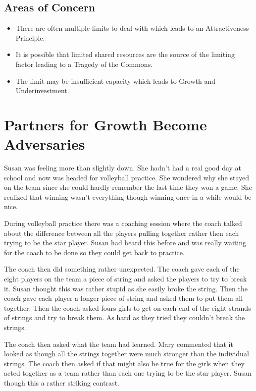 \documentclass[]{memoir}
\begin{document}
\subsection{Areas of Concern}

\begin{itemize}
\itemsep1pt\parskip0pt
\item
  There are often multiple limits to deal with which leads to an
  Attractiveness Principle.
\item
  It is possible that limited shared resources are the source of the
  limiting factor leading to a Tragedy of the Commons.
\item
  The limit may be insufficient capacity which leads to Growth and
  Underinvestment.
\end{itemize}

\section{Partners for Growth Become Adversaries}

Susan was feeling more than slightly down. She hadn't had a real good
day at school and now was headed for volleyball practice. She wondered
why she stayed on the team since she could hardly remember the last time
they won a game. She realized that winning wasn't everything though
winning once in a while would be nice.

During volleyball practice there was a coaching session where the coach
talked about the difference between all the players pulling together
rather then each trying to be the star player. Susan had heard this
before and was really waiting for the coach to be done so they could get
back to practice.

The coach then did something rather unexpected. The coach gave each of
the eight players on the team a piece of string and asked the players to
try to break it. Susan thought this was rather stupid as she easily
broke the string. Then the coach gave each player a longer piece of
string and asked them to put them all together. Then the coach asked
fours girls to get on each end of the eight strands of strings and try
to break them. As hard as they tried they couldn't break the strings.

The coach then asked what the team had learned. Mary commented that it
looked as though all the strings together were much stronger than the
individual strings. The coach then asked if that might also be true for
the girls when they acted together as a team rather than each one trying
to be the star player. Susan though this a rather striking contrast.
\end{document}

